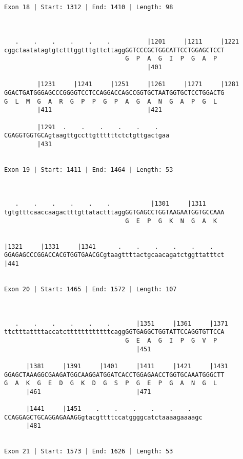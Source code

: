 \documentclass{article}
\begin{document}
\begin{Verbatim}
  
 
Exon 18 | Start: 1312 | End: 1410 | Length: 98



   .    .    .    .    .    .          |1201     |1211     |1221
cggctaatatagtgtctttggtttgttcttaggGGTCCCGCTGGCATTCCTGGAGCTCCT
                                 G  P  A  G  I  P  G  A  P  
                                       |401                 
  
         |1231     |1241     |1251     |1261     |1271     |1281
GGACTGATGGGAGCCCGGGGTCCTCCAGGACCAGCCGGTGCTAATGGTGCTCCTGGACTG
G  L  M  G  A  R  G  P  P  G  P  A  G  A  N  G  A  P  G  L  
         |411                          |421                 
  
         |1291  .    .    .    .    .    .   
CGAGGTGGTGCAgtaagttgccttgttttttctctgttgactgaa
         |431                                
  
 
Exon 19 | Start: 1411 | End: 1464 | Length: 53



   .    .    .    .    .    .           |1301     |1311     
tgtgtttcaaccaagactttgttatactttaggGGTGAGCCTGGTAAGAATGGTGCCAAA
                                 G  E  P  G  K  N  G  A  K  
                                                            
  
|1321     |1331     |1341      .    .    .    .    .    .   
GGAGAGCCCGGACCACGTGGTGAACGCgtaagttttactgcaacagatctggttatttct
|441                                                        
  
 
Exon 20 | Start: 1465 | End: 1572 | Length: 107



   .    .    .    .    .    .       |1351     |1361     |1371
ttctttattttaccatcttttttttttttcaggGGTGAGGCTGGTATTCCAGGTGTTCCA
                                 G  E  A  G  I  P  G  V  P  
                                    |451                    
  
      |1381     |1391     |1401     |1411     |1421     |1431
GGAGCTAAAGGCGAAGATGGCAAGGATGGATCACCTGGAGAACCTGGTGCAAATGGGCTT
G  A  K  G  E  D  G  K  D  G  S  P  G  E  P  G  A  N  G  L  
      |461                          |471                    
  
      |1441     |1451    .    .    .    .    .    .   
CCAGGAGCTGCAGGAGAAAGGgtacgttttccatggggcatctaaaagaaaagc
      |481                                            
  
 
Exon 21 | Start: 1573 | End: 1626 | Length: 53




\end{Verbatim}
\end{document}

